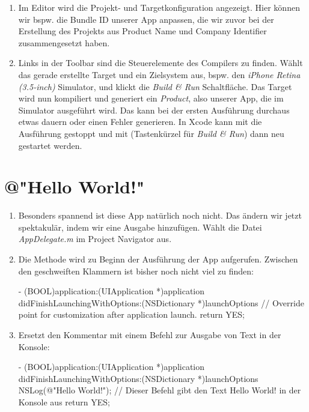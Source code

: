 \documentclass[parskip=half, final]{scrreprt}
\begin{document}
\begin{lecture}
\begin{enumerate}
\item Im Editor wird die Projekt- und Targetkonfiguration angezeigt. Hier können wir bspw. die Bundle ID unserer App anpassen, die wir zuvor bei der Erstellung des Projekts aus Product Name und Company Identifier zusammengesetzt haben.

\item Links in der Toolbar sind die Steuerelemente des Compilers zu finden. Wählt das gerade erstellte Target und ein Zielsystem aus, bspw. den \emph{iPhone Retina (3.5-inch)} Simulator, und klickt die \emph{Build \& Run} Schaltfläche. Das Target wird nun kompiliert und generiert ein \emph{Product}, also unserer App, die im Simulator ausgeführt wird. Das kann bei der ersten Ausführung durchaus etwas dauern oder einen Fehler generieren. In Xcode kann mit  die Ausführung gestoppt und mit  (Tastenkürzel für \emph{Build \& Run}) dann neu gestartet werden.

\end{enumerate}


\section{@"{}Hello World!"{}}

\begin{enumerate}

\item Besonders spannend ist diese App natürlich noch nicht. Das ändern wir jetzt spektakulär, indem wir eine Ausgabe hinzufügen. Wählt die Datei \emph{AppDelegate.m} im Project Navigator aus.

\item Die Methode  wird zu Beginn der Ausführung der App aufgerufen. Zwischen den geschweiften Klammern ist bisher noch nicht viel zu finden:

\begin{objclst}
- (BOOL)application:(UIApplication *)application didFinishLaunchingWithOptions:(NSDictionary *)launchOptions {
    // Override point for customization after application launch.
    return YES;
}
\end{objclst}

\item Ersetzt den Kommentar mit einem Befehl zur Ausgabe von Text in der Konsole:

\begin{objclst}
- (BOOL)application:(UIApplication *)application didFinishLaunchingWithOptions:(NSDictionary *)launchOptions {
    NSLog(@"Hello World!"); // Dieser Befehl gibt den Text Hello World! in der Konsole aus
    return YES;
}
\end{objclst}


\end{enumerate}
\end{lecture}
\end{document}
